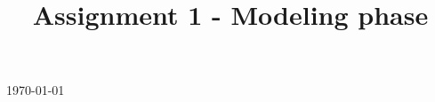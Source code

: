 \documentclass[a4paper, 11pt]{article}
\begin{document}
\begin{titlepage}


{\large \today}\\[2cm] %




\vfill %

\end{titlepage}
\title{Assignment 1 - Modeling phase}
\newpage
\end{document}

